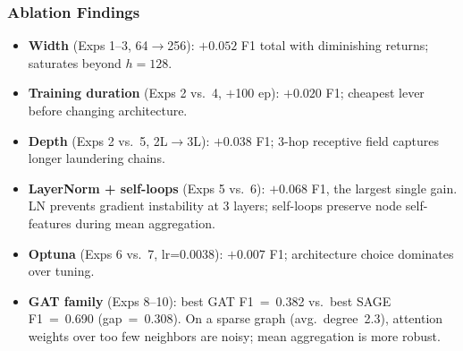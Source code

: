 \documentclass[conference]{IEEEtran}
\begin{document}
\begin{table}[htbp]
\centering
\caption{GNN Ablation --- 10 Controlled Experiments}
\label{tab:gnn_ablation}
\renewcommand{\arraystretch}{1.1}
\end{table}

\subsubsection{Ablation Findings}

\begin{itemize}
  \item \textbf{Width} (Exps 1--3, 64$\to$256): $+0.052$ F1 total with
        diminishing returns; saturates beyond $h{=}128$.
  \item \textbf{Training duration} (Exps 2 vs.\ 4, $+$100 ep): $+0.020$ F1;
        cheapest lever before changing architecture.
  \item \textbf{Depth} (Exps 2 vs.\ 5, 2L$\to$3L): $+0.038$ F1; 3-hop
        receptive field captures longer laundering chains.
  \item \textbf{LayerNorm + self-loops} (Exps 5 vs.\ 6): $\mathbf{+0.068}$ F1,
        the largest single gain.  LN prevents gradient instability at 3 layers;
        self-loops preserve node self-features during mean aggregation.
  \item \textbf{Optuna} (Exps 6 vs.\ 7, lr=0.0038): $+0.007$ F1; architecture
        choice dominates over tuning.
  \item \textbf{GAT family} (Exps 8--10): best GAT F1~=~0.382 vs.\ best SAGE
        F1~=~0.690 (gap~=~0.308).  On a sparse graph (avg.\ degree~2.3),
        attention weights over too few neighbors are noisy; mean aggregation
        is more robust.
\end{itemize}
\end{document}

